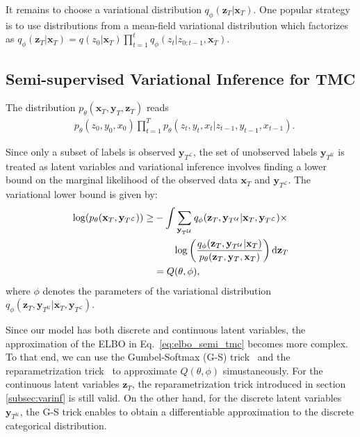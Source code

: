 \documentclass{article}
\def\x{{\mathbf x}}
\def\z{{\mathbf z}}
\def\y{{\mathbf y}}
\def\yl{{\mathbf y}_{T^{\mathcal{L}}}}
\def\yu{{\mathbf y}_{T^{\mathcal{U}}}}
\def\p{p_{\theta}}
\def\q{q_\phi}
\newcommand{\katy}[1]{\todo[inline,color=pink]{#1 --- Katy}}
\begin{document}
It remains to choose a variational distribution $\q(\z_T|\x_T)$.
One popular strategy is to use distributions from a mean-field variational 
distribution which factorizes as  $\q(\z_T|\x_T)=q(z_0|\x_T) \prod_{t=1}^t
\q(z_t|z_{0:t-1},\x_T)$.

\subsection{Semi-supervised Variational Inference for TMC}
\label{subsec:vi_tmc}


The distribution $p_{\theta}(\x_T, \y_T, \z_T)$ reads
\begin{align}
\label{eq:TMC}
&p_{\theta}(z_0,y_0, x_0) \prod_{t=1}^T  p_{\theta}(z_t, y_t, x_t|z_{t-1},y_{t-1}, x_{t-1})   \text{.}
\end{align}


Since  only a subset of labels is observed $\yl$, the set of unobserved 
labels $\yu$ is treated as latent variables and variational inference 
involves finding a lower bound on the marginal likelihood of the observed data $\x_T$ and $\yl$.
The variational lower bound is given by: 
\begin{align}
    \label{eq:elbo_semi_tmc}
    \log(\p(\x_T, \yl) )   \geq  & -  \int \sum_{\yu}  \q(\z_T, \yu|\x_T, \yl) \times \nonumber \\ 
    & \quad \quad  \log \left(\frac{\q(\z_T,\yu  |\x_T)}{\p(\z_T,\y_T, \x_T)}\right)  {\rm d} \z_T \nonumber \\
    & =  Q(\theta,\phi) \text{,}  
\end{align}
where $\phi$ denotes the parameters of the variational distribution 
$\q(\z_T,\yu|\x_T, \yl)$.

Since our model has both discrete and continuous latent variables, 
the approximation of the ELBO in Eq.~\eqref{eq:elbo_semi_tmc} becomes more complex.
To that end,  we can use the Gumbel-Softmax (G-S) 
trick~\cite{maddison2016concrete, jang2016categorical} and the reparametrization
trick~\cite{kingma2013auto} to approximate $Q(\theta,\phi)$ simustaneously.
For the continuous latent variables $\z_T$, the reparametrization 
trick introduced in section \ref{subsec:varinf} is still valid.
On the other hand, for the discrete latent variables $\yu$, 
the G-S trick enables to obtain a differentiable approximation to the discrete
categorical distribution. 
\end{document}
